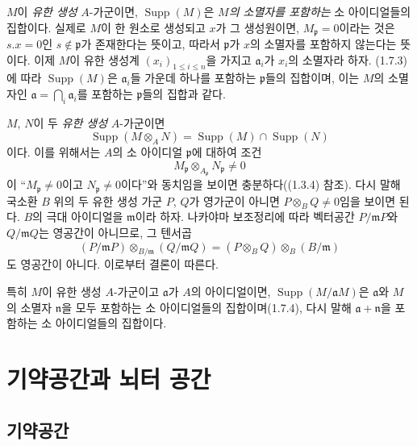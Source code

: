 \begin{env}[1.7.4]
\label{0.1.7.4-ko}
$M$이 \emph{유한 생성} $A$-가군이면, $\operatorname{Supp}(M)$은 \emph{$M$의 소멸자를 포함하는} 소 아이디얼들의 집합이다. 실제로 $M$이 한 원소로 생성되고 $x$가 그 생성원이면, $M_{\mathfrak p}=0$이라는 것은 $s.x=0$인 $s\notin\mathfrak p$가 존재한다는 뜻이고, 따라서 $\mathfrak p$가 $x$의 소멸자를 포함하지 않는다는 뜻이다. 이제 $M$이 유한 생성계 $(x_i)_{1\leq i\leq n}$을 가지고 $\mathfrak a_i$가 $x_i$의 소멸자라 하자. (1.7.3)에 따라 $\operatorname{Supp}(M)$은 $\mathfrak a_i$들 가운데 하나를 포함하는 $\mathfrak p$들의 집합이며, 이는 $M$의 소멸자인 $\mathfrak a=\bigcap_i\mathfrak a_i$를 포함하는 $\mathfrak p$들의 집합과 같다.
\end{env}

\begin{env}[1.7.5]
\label{0.1.7.5-ko}
$M$, $N$이 두 \emph{유한 생성} $A$-가군이면
\[
  \operatorname{Supp}(M\otimes_A N)
  =\operatorname{Supp}(M)\cap\operatorname{Supp}(N)
\]
이다. 이를 위해서는 $A$의 소 아이디얼 $\mathfrak p$에 대하여 조건
\[
  M_{\mathfrak p}\otimes_{A_{\mathfrak p}}N_{\mathfrak p}\neq0
\]
이 ``$M_{\mathfrak p}\neq0$이고 $N_{\mathfrak p}\neq0$이다''와 동치임을 보이면 충분하다((1.3.4) 참조). 다시 말해 국소환 $B$ 위의 두 유한 생성 가군 $P$, $Q$가 영가군이 아니면 $P\otimes_BQ\neq0$임을 보이면 된다. $B$의 극대 아이디얼을 $\mathfrak m$이라 하자. 나카야마 보조정리에 따라 벡터공간 $P/\mathfrak mP$와 $Q/\mathfrak mQ$는 영공간이 아니므로, 그 텐서곱
\[
  (P/\mathfrak mP)\otimes_{B/\mathfrak m}(Q/\mathfrak mQ)
  =(P\otimes_B Q)\otimes_B(B/\mathfrak m)
\]
도 영공간이 아니다. 이로부터 결론이 따른다.

특히 $M$이 유한 생성 $A$-가군이고 $\mathfrak a$가 $A$의 아이디얼이면, $\operatorname{Supp}(M/\mathfrak aM)$은 $\mathfrak a$와 $M$의 소멸자 $\mathfrak n$을 모두 포함하는 소 아이디얼들의 집합이며(1.7.4), 다시 말해 $\mathfrak a+\mathfrak n$을 포함하는 소 아이디얼들의 집합이다.
\end{env}


\section{기약공간과 뇌터 공간}
\label{section:0.2-ko}

\subsection{기약공간}
\label{subsection:0.2.1-ko}

